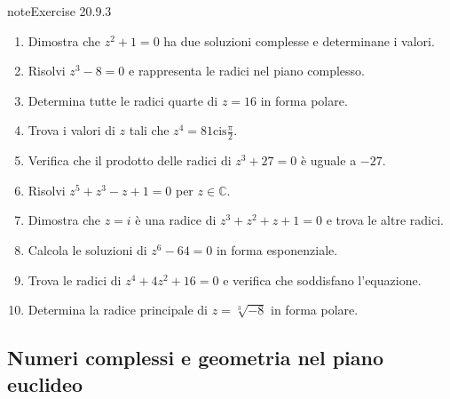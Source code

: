 \documentclass[letterpaper,10pt,italian]{jupyterBook}
\begin{document}
\begin{sphinxadmonition}{note}{Exercise 20.9.3}


\begin{enumerate}
%
\item {} 
\sphinxAtStartPar
Dimostra che \(z^2 + 1 = 0\) ha due soluzioni complesse e determinane i valori.

\item {} 
\sphinxAtStartPar
Risolvi \(z^3 - 8 = 0\) e rappresenta le radici nel piano complesso.

\item {} 
\sphinxAtStartPar
Determina tutte le radici quarte di \(z = 16\) in forma polare.

\item {} 
\sphinxAtStartPar
Trova i valori di \(z\) tali che \(z^4 = 81 \text{cis}\frac{\pi}{2}\).

\item {} 
\sphinxAtStartPar
Verifica che il prodotto delle radici di \(z^3 + 27 = 0\) è uguale a \(-27\).

\item {} 
\sphinxAtStartPar
Risolvi \(z^5 + z^3 - z + 1 = 0\) per \(z \in \mathbb{C}\).

\item {} 
\sphinxAtStartPar
Dimostra che \(z = i\) è una radice di \(z^3 + z^2 + z + 1 = 0\) e trova le altre radici.

\item {} 
\sphinxAtStartPar
Calcola le soluzioni di \(z^6 - 64 = 0\) in forma esponenziale.

\item {} 
\sphinxAtStartPar
Trova le radici di \(z^4 + 4z^2 + 16 = 0\) e verifica che soddisfano l’equazione.

\item {} 
\sphinxAtStartPar
Determina la radice principale di \(z = \sqrt[3]{-8}\) in forma polare.

\end{enumerate}
\end{sphinxadmonition}


\subsection{Numeri complessi e geometria nel piano euclideo}
\label{\detokenize{ch/algebra/complex-algebra-problems:numeri-complessi-e-geometria-nel-piano-euclideo}}\label{\detokenize{ch/algebra/complex-algebra-problems:math-hs-algebra-complex-problems-geometry-2d}} \label{exercise:math-hs:algebra:complex:problems:geometry-2d:ex}
\end{document}
